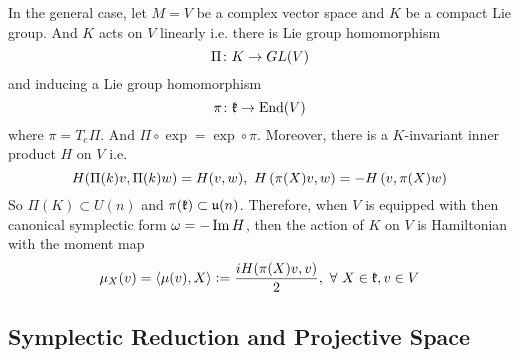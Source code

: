 \documentclass[a4paper,12pt]{article}
\begin{document}
	\begin{rem}
		In the general case, let $M = V$ be a complex vector space and $K$ be a compact Lie group. And $K$ acts on $V$ linearly i.e. there is Lie group homomorphism
		\begin{equation*}
			\Pi \colon K \rightarrow GL(V)
		\end{equation*}
		and inducing a Lie group homomorphism
		\begin{equation*}
			\pi \colon \mathfrak{k} \rightarrow \operatorname{End}(V)
		\end{equation*}
		where $\pi  = T_e\Pi$. And $\Pi\circ \exp = \exp \circ \pi$. Moreover, there is a $K$-invariant inner product $H$ on $V$ i.e.
		\begin{equation*}
			H(\Pi(k)v,\Pi(k)w) = H(v,w),~H\left(\pi(X)v,w\right) = -H\left(v,\pi(X)w\right)
		\end{equation*}
		So $\Pi(K) \subset U(n)$ and $\pi(\mathfrak{k}) \subset \mathfrak{u}(n)$. Therefore, when $V$ is equipped with then canonical symplectic form $\omega = -\operatorname{Im} H$, then the action of $K$ on $V$ is Hamiltonian with the moment map
		\begin{equation*}
			\mu_X(v) = \left\langle \mu(v),X \right\rangle \vcentcolon= \frac{iH(\pi(X)v,v)}{2},~\forall~X\in \mathfrak{k},v\in V
		\end{equation*}
	\end{rem}

	\subsection{Symplectic Reduction and Projective Space}
	
\end{document}
